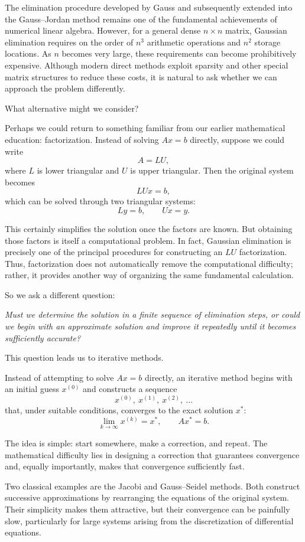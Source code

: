 \documentclass[11pt,a4paper]{article}
\theoremstyle{definition}
\theoremstyle{remark}
\begin{document}
The elimination procedure developed by Gauss and
subsequently extended into the Gauss--Jordan method
remains one of the fundamental achievements of
numerical linear algebra. However, for a general
dense $n\times n$ matrix, Gaussian elimination
requires on the order of $n^3$ arithmetic operations
and $n^2$ storage locations. As $n$ becomes very
large, these requirements can become prohibitively
expensive. Although modern direct methods exploit
sparsity and other special matrix structures to
reduce these costs, it is natural to ask whether
we can approach the problem differently.

What alternative might we consider?

Perhaps we could return to something familiar from
our earlier mathematical education: factorization.
Instead of solving $Ax=b$ directly, suppose we
could write
\[
    A=LU,
\]
where $L$ is lower triangular and $U$ is upper
triangular. Then the original system becomes
\[
    LUx=b,
\]
which can be solved through two triangular systems:
\[
    Ly=b,\qquad Ux=y.
\]

This certainly simplifies the solution once the
factors are known. But obtaining those factors is
itself a computational problem. In fact, Gaussian
elimination is precisely one of the principal
procedures for constructing an $LU$ factorization.
Thus, factorization does not automatically remove
the computational difficulty; rather, it provides
another way of organizing the same fundamental
calculation.

So we ask a different question:

\emph{Must we determine the solution in a finite
sequence of elimination steps, or could we begin
with an approximate solution and improve it
repeatedly until it becomes sufficiently accurate?}

This question leads us to iterative methods.

Instead of attempting to solve $Ax=b$ directly,
an iterative method begins with an initial guess
$x^{(0)}$ and constructs a sequence
\[
    x^{(0)},\ x^{(1)},\ x^{(2)},\ \ldots
\]
that, under suitable conditions, converges to
the exact solution $x^*$:
\[
    \lim_{k\to\infty}x^{(k)}=x^*,
    \qquad Ax^*=b.
\]

The idea is simple: start somewhere, make a
correction, and repeat. The mathematical difficulty
lies in designing a correction that guarantees
convergence and, equally importantly, makes that
convergence sufficiently fast.

Two classical examples are the Jacobi and
Gauss--Seidel methods. Both construct successive
approximations by rearranging the equations of
the original system. Their simplicity makes them
attractive, but their convergence can be painfully
slow, particularly for large systems arising from
the discretization of differential equations.
\end{document}
